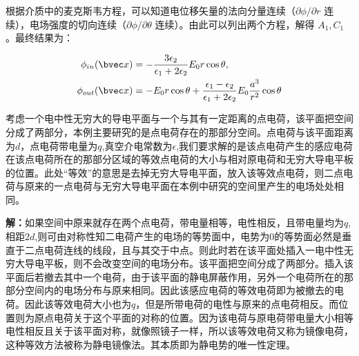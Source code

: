 根据介质中的麦克斯韦方程，可以知道电位移矢量的法向分量连续（$\partial\phi/\partial r$ 连续），电场强度的切向连续（$\partial\phi/\partial \theta$ 连续）。由此可以列出两个方程，解得 $A_1,C_1$。最终结果为：

\begin{align}
\phi_{in}(\bvec x)&=-\frac{3\epsilon_2}{\epsilon_1+2\epsilon_2}E_0r\cos\theta,\\
\phi_{out}(\bvec x)&=-E_0r\cos\theta+\frac{\epsilon_1-\epsilon_2}{\epsilon_1+2\epsilon_2}E_0\frac{a^3}{r^2}\cos\theta
\end{align}
\begin{example}{}\label{empoi_ex1}
考虑一个电中性无穷大的导电平面与一个与其有一定距离的点电荷，该平面把空间分成了两部分，本例主要研究的是点电荷存在的那部分空间。点电荷与该平面距离为$d$，点电荷带电量为$q$,真空介电常数为$\epsilon$,我们要求解的是该点电荷产生的感应电荷在该点电荷所在的那部分区域的等效点电荷的大小与相对原电荷和无穷大导电平板的位置。此处“等效”的意思是去掉无穷大导电平面，放入该等效点电荷，则二点电荷与原来的一点电荷与无穷大导电平面在本例中研究的空间里产生的电场处处相同。
\end{example}
\textbf{解：}如果空间中原来就存在两个点电荷，带电量相等，电性相反，且带电量均为$q$,相距$2d$,则可由对称性知二电荷产生的电场的等势面中，电势为$0$的等势面必然是垂直于二点电荷连线的线段，且与其交于中点。则此时若在该平面处插入一电中性无穷大导电平板，则不会改变空间的电场分布。该平面把空间分成了两部分。插入该平面后若撤去其中一个电荷，由于该平面的静电屏蔽作用，另外一个电荷所在的那部分空间内的电场分布与原来相同。因此该感应电荷的等效电荷即为被撤去的电荷。因此该等效电荷大小也为$q$，但是所带电荷的电性与原来的点电荷相反。而位置则为原点电荷关于这个平面的对称的位置。因为该电荷与原电荷带电量大小相等电性相反且关于该平面对称，就像照镜子一样，所以该等效电荷又称为镜像电荷，这种等效方法被称为静电镜像法。其本质即为静电势的唯一性定理。
